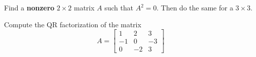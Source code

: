 \documentclass[minion]{homework}
\begin{document}
\begin{problems}
\problem Find a \textbf{nonzero} $2\times 2$ matrix $A$ such that $A^2=0$.
Then do the same for a $3\times 3$.

\problem Compute the QR factorization of the matrix
\[
A = \begin{bmatrix} 1 & 2 & 3 \\
    -1 & 0 & -3 \\
    0 & -2 & 3
\end{bmatrix}    
\]

\end{problems}
\end{document}
